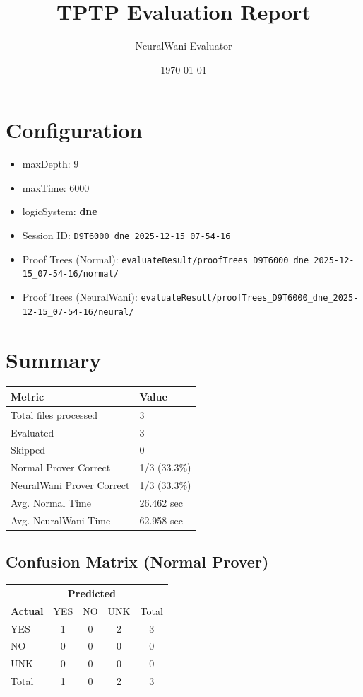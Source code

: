 \documentclass[a4paper,10pt]{article}
\title{TPTP Evaluation Report}
\author{NeuralWani Evaluator}
\date{\today}
\begin{document}
\maketitle

\section{Configuration}
\begin{itemize}
\item maxDepth: 9
\item maxTime: 6000
\item logicSystem: \textbf{dne}
\item Session ID: \texttt{D9T6000\_dne\_2025-12-15\_07-54-16}
\item Proof Trees (Normal): \texttt{evaluateResult/proofTrees\_D9T6000\_dne\_2025-12-15\_07-54-16/normal/}
\item Proof Trees (NeuralWani): \texttt{evaluateResult/proofTrees\_D9T6000\_dne\_2025-12-15\_07-54-16/neural/}
\end{itemize}

\section{Summary}

\begin{tabular}{ll}
\toprule
\textbf{Metric} & \textbf{Value} \\
\midrule
Total files processed & 3 \\
Evaluated & 3 \\
Skipped & 0 \\
\midrule
Normal Prover Correct & 1/3 (33.3\%) \\
NeuralWani Prover Correct & 1/3 (33.3\%) \\
\midrule
Avg. Normal Time & 26.462 sec \\
Avg. NeuralWani Time & 62.958 sec \\
\bottomrule
\end{tabular}

\subsection{Confusion Matrix (Normal Prover)}

\begin{tabular}{l|ccc|c}
\toprule
 & \multicolumn{3}{c|}{\textbf{Predicted}} & \\
\textbf{Actual} & YES & NO & UNK & Total \\
\midrule
YES & 1 & 0 & 2 & 3 \\
NO & 0 & 0 & 0 & 0 \\
UNK & 0 & 0 & 0 & 0 \\
\midrule
Total & 1 & 0 & 2 & 3 \\
\bottomrule
\end{tabular}
\end{document}
